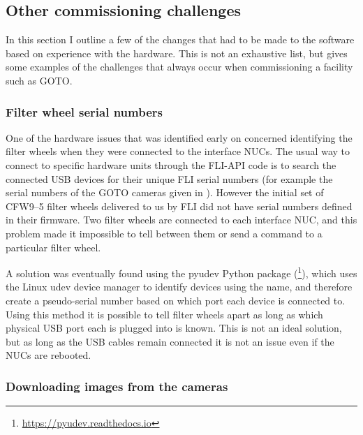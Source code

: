 \subsection{Other commissioning challenges}
\label{sec:challenges}
\begin{colsection}

In this section I outline a few of the changes that had to be made to the software based on experience with the hardware. This is not an exhaustive list, but gives some examples of the challenges that always occur when commissioning a facility such as GOTO.\@

\subsubsection{Filter wheel serial numbers}

One of the hardware issues that was identified early on concerned identifying the filter wheels when they were connected to the interface NUCs. The usual way to connect to specific hardware units through the FLI-API code is to search the connected USB devices for their unique FLI serial numbers (for example the serial numbers of the GOTO cameras given in ). However the initial set of CFW9--5 filter wheels delivered to us by FLI did not have serial numbers defined in their firmware. Two filter wheels are connected to each interface NUC, and this problem made it impossible to tell between them or send a command to a particular filter wheel.

A solution was eventually found using the pyudev Python package (\footnote{\url{https://pyudev.readthedocs.io}}), which uses the Linux udev device manager to identify devices using the  name, and therefore create a pseudo-serial number based on which port each device is connected to. Using this method it is possible to tell filter wheels apart as long as which physical USB port each is plugged into is known. This is not an ideal solution, but as long as the USB cables remain connected it is not an issue even if the NUCs are rebooted.

\subsubsection{Downloading images from the cameras}


\end{colsection}
